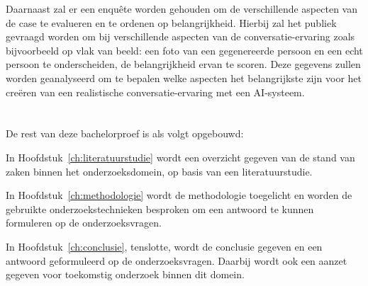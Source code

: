Daarnaast zal er een enquête worden gehouden om de verschillende aspecten van de case te evalueren en te ordenen op belangrijkheid. 
Hierbij zal het publiek gevraagd worden om bij verschillende aspecten van de conversatie-ervaring zoals bijvoorbeeld op vlak van beeld: een foto van een gegenereerde persoon en een echt persoon te onderscheiden, de belangrijkheid ervan te scoren. Deze gegevens zullen worden geanalyseerd om te bepalen welke aspecten het belangrijkste zijn voor het creëren van een realistische conversatie-ervaring met een AI-systeem.

\section{}
\label{sec:opzet-bachelorproef}


De rest van deze bachelorproef is als volgt opgebouwd:

In Hoofdstuk~\ref{ch:literatuurstudie} wordt een overzicht gegeven van de stand van zaken binnen het onderzoeksdomein, op basis van een literatuurstudie.

In Hoofdstuk~\ref{ch:methodologie} wordt de methodologie toegelicht en worden de gebruikte onderzoekstechnieken besproken om een antwoord te kunnen formuleren op de onderzoeksvragen.


In Hoofdstuk~\ref{ch:conclusie}, tenslotte, wordt de conclusie gegeven en een antwoord geformuleerd op de onderzoeksvragen. Daarbij wordt ook een aanzet gegeven voor toekomstig onderzoek binnen dit domein.